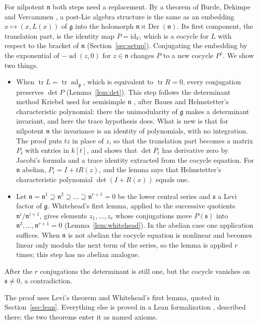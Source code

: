 \documentclass[11pt]{article}
\theoremstyle{definition}
\theoremstyle{remark}
\newcommand{\g}{\mathfrak{g}}
\newcommand{\n}{\mathfrak{n}}
\newcommand{\s}{\mathfrak{s}}
\DeclareMathOperator{\ad}{ad}
\DeclareMathOperator{\tr}{tr}
\DeclareMathOperator{\Der}{Der}
\begin{document}
For nilpotent $\n$ both steps need a replacement. By a theorem of Burde,
Dekimpe and Vercammen \cite[Proposition 2.13]{BDV}, a post-Lie algebra
structure is the same as an embedding $x\mapsto(x,L(x))$ of $\g$ into the
holomorph $\n\rtimes\Der(\n)$. Its first component, the translation part,
is the identity map $P=\mathrm{id}_V$, which is a cocycle for $L$ with
respect to the bracket of $\n$ (Section~\ref{sec:setup}). Conjugating the
embedding by the exponential of $-\ad(z,0)$ for $z\in\n$ changes $P$ to a
new cocycle $P^z$. We show two things.
\begin{itemize}
\item When $\tr L=\tr\ad_\g$, which is equivalent to $\tr R=0$, every
conjugation preserves $\det P$ (Lemma~\ref{lem:det}). This step follows
the determinant method Kriebel used for semisimple $\n$ \cite{Kr}, after
Baues \cite{Ba} and Helmstetter's characteristic polynomial: there the
unimodularity of $\g$ makes a determinant invariant, and here the trace
hypothesis does. What is new is that for nilpotent $\n$ the invariance is
an identity of polynomials, with no integration. The proof puts $tz$ in
place of $z$, so that the translation part becomes a matrix $P_t$ with
entries in $k[t]$, and shows that $\det P_t$ has derivative zero by
Jacobi's formula and a trace identity extracted from the cocycle equation.
For $\n$ abelian, $P_t=I+tR(z)$, and the lemma says that Helmstetter's
characteristic polynomial $\det(I+R(x))$ \cite[\S3]{Fo} equals one.
\item Let $\n=\n^1\supseteq\n^2\supseteq\dots\supseteq\n^{r+1}=0$ be the
lower central series and $\s$ a Levi factor of $\g$. Whitehead's first
lemma, applied to the successive quotients $\n^i/\n^{i+1}$, gives elements
$z_1,\dots,z_r$ whose conjugations move $P(\s)$ into
$\n^2,\dots,\n^{r+1}=0$ (Lemma~\ref{lem:whitehead}). In the abelian case
one application suffices. When $\n$ is not abelian the cocycle equation is
nonlinear and becomes linear only modulo the next term of the series, so
the lemma is applied $r$ times; this step has no abelian analogue.
\end{itemize}
After the $r$ conjugations the determinant is still one, but the cocycle
vanishes on $\s\ne0$, a contradiction.

The proof uses Levi's theorem and Whitehead's first lemma, quoted in
Section~\ref{sec:lean}. Everything else is proved in a Lean formalization
\cite{Lean,Mathlib}, described there; the two theorems enter it as named
axioms.
\end{document}
